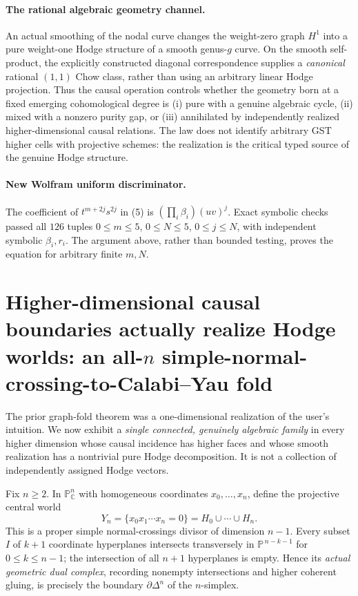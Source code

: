 \documentclass[11pt]{article}
\begin{document}
\paragraph{The rational algebraic geometry channel.}
An actual smoothing of the nodal curve changes the
weight-zero graph $H^1$ into a pure weight-one Hodge
structure of a smooth genus-$g$ curve. On the
smooth self-product, the explicitly constructed
diagonal correspondence supplies a \emph{canonical}
rational $(1,1)$ Chow class, rather than using an
arbitrary linear Hodge projection. Thus the
causal operation controls whether the geometry born
at a fixed emerging cohomological degree is
(i) pure with a genuine algebraic cycle,
(ii) mixed with a nonzero purity gap, or
(iii) annihilated by independently realized
higher-dimensional causal relations.
The law does not identify arbitrary GST higher cells
with projective schemes: the realization is the
critical typed source of the genuine Hodge structure.

\paragraph{New Wolfram uniform discriminator.}
The coefficient of
$t^{m+2j}s^{2j}$ in (5) is
$(\prod_i\beta_i)(uv)^j$.
Exact symbolic checks passed all $126$ tuples
$0\le m\le5$, $0\le N\le5$, $0\le j\le N$,
with independent symbolic $\beta_i,r_i$.
The argument above, rather than bounded testing,
proves the equation for arbitrary finite $m,N$.


\section{Higher-dimensional causal boundaries actually realize Hodge worlds:
an all-$n$ simple-normal-crossing-to-Calabi--Yau fold}

The prior graph-fold theorem was a one-dimensional realization of the
user's intuition.  We now exhibit a \emph{single connected, genuinely
algebraic family} in every higher dimension whose causal incidence
has higher faces and whose smooth realization has a nontrivial
pure Hodge decomposition.  It is not a collection of independently
assigned Hodge vectors.

Fix $n\ge2$. In $\mathbb P_{\mathbb C}^{n}$ with homogeneous
coordinates $x_0,\ldots,x_n$, define the projective central world
\[
 Y_n=\bigl\{x_0x_1\cdots x_n=0\bigr\}
    =H_0\cup\cdots\cup H_n.
\]
This is a proper simple normal-crossings divisor of dimension $n-1$.
Every subset $I$ of $k+1$ coordinate hyperplanes intersects
transversely in $\mathbb P^{\,n-k-1}$ for $0\le k\le n-1$;
the intersection of all $n+1$ hyperplanes is empty.
Hence its \emph{actual geometric dual complex}, recording nonempty
intersections and higher coherent gluing, is precisely the
boundary $\partial\Delta^n$ of the $n$-simplex.
\end{document}
